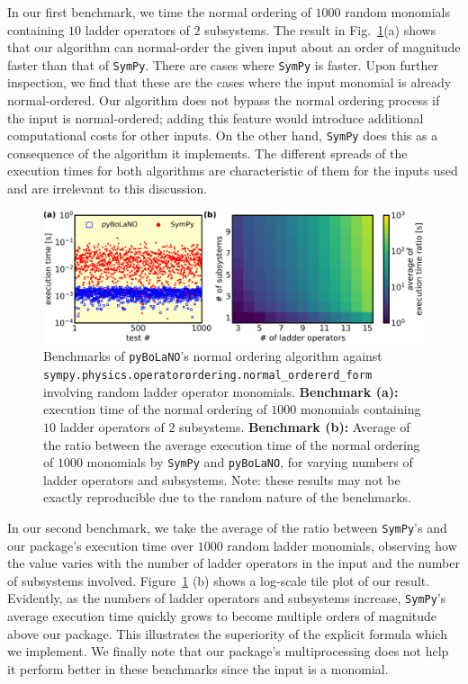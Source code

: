 \documentclass[onecolumn, 12pt, sort&compress]{elsarticle}
\newenvironment{revision}{%
\color{red}
}
{}
\begin{document}
\begin{revision}
In our first benchmark, we time the normal ordering of $1000$ random monomials containing $10$ ladder operators of $2$ subsystems. The result in Fig.~\ref{fig_2}(a) shows that our algorithm can normal-order the given input about an order of magnitude faster than that of \texttt{SymPy}. There are cases where \texttt{SymPy} is faster.  Upon further inspection, we find that these are the cases where the input monomial is already normal-ordered. Our algorithm does not bypass the normal ordering process if the input is normal-ordered; adding this feature would introduce additional computational costs for other inputs. On the other hand, \texttt{SymPy} does this as a consequence of the algorithm it implements. The different spreads of the execution times for both algorithms are characteristic of them for the inputs used and are irrelevant to this discussion. 

\begin{figure}[!t]
    \centering
    \includegraphics[width=\linewidth]{fig_2.png}
    \caption{\begin{revision}Benchmarks of \texttt{pyBoLaNO}'s normal ordering algorithm against \texttt{sympy.physics.operatorordering.normal\_ordererd\_form} involving random ladder operator monomials. \textbf{Benchmark (a):} execution time of the normal ordering of $1000$ monomials containing $10$ ladder operators of $2$ subsystems. \textbf{Benchmark (b):} Average of the ratio between the average execution time of the normal ordering of $1000$ monomials by \texttt{SymPy} and \texttt{pyBoLaNO}, for varying numbers of ladder operators and subsystems. Note: these results may not be exactly reproducible due to the random nature of the benchmarks.\end{revision}}
    \label{fig_2}
\end{figure}

In our second benchmark, we take the average of the ratio between \texttt{SymPy}'s and our package's execution time over $1000$ random ladder monomials, observing how the value varies with the number of ladder operators in the input and the number of subsystems involved. Figure~\ref{fig_2} (b) shows a log-scale tile plot of our result. Evidently, as the numbers of ladder operators and subsystems increase, \texttt{SymPy}'s average execution time quickly grows to become multiple orders of magnitude above our package. This illustrates the superiority of the explicit formula which we implement.  We finally note that our package's multiprocessing does not help it perform better in these benchmarks since the input is a monomial. 

\end{revision}
\end{document}
